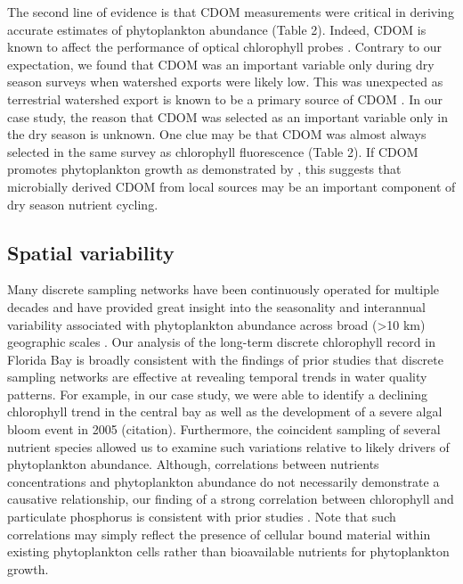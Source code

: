 \documentclass[review]{elsarticle}
\begin{document}
The second line of evidence is that CDOM measurements were critical in deriving accurate estimates of phytoplankton abundance (Table 2). Indeed, CDOM is known to affect the performance of optical chlorophyll probes \citep{du2010characteristics}. Contrary to our expectation, we found that CDOM was an important variable only during dry season surveys when watershed exports were likely low. This was unexpected as terrestrial watershed export is known to be a primary source of CDOM \citep{du2010characteristics}. In our case study, the reason that CDOM was selected as an important variable only in the dry season is unknown. One clue may be that CDOM was almost always selected in the same survey as chlorophyll fluorescence (Table 2). If CDOM promotes phytoplankton growth as demonstrated by \citet{traving2017effect}, this suggests that microbially derived CDOM from local sources may be an important component of dry season nutrient cycling.

\subsection{Spatial variability}

Many discrete sampling networks have been continuously operated for multiple decades and have provided great insight into the seasonality and interannual variability associated with phytoplankton abundance across broad (>10 km) geographic scales \citep{cloern_patterns_2010}. Our analysis of the long-term discrete chlorophyll record in Florida Bay is broadly consistent with the findings of prior studies that discrete sampling networks are effective at revealing temporal trends in water quality patterns. For example, in our case study, we were able to identify a declining chlorophyll trend in the central bay as well as the development of a severe algal bloom event in 2005 (citation). Furthermore, the coincident sampling of several nutrient species allowed us to examine such variations relative to likely drivers of phytoplankton abundance. Although, correlations between nutrients concentrations and phytoplankton abundance do not necessarily demonstrate a causative relationship, our finding of a strong correlation between chlorophyll and particulate phosphorus is consistent with prior studies \citep[Table 1;][]{fourqurean1993process}. Note that such correlations may simply reflect the presence of cellular bound material within existing phytoplankton cells rather than bioavailable nutrients for phytoplankton growth. 
\end{document}
